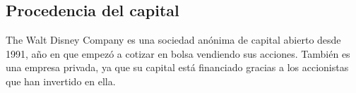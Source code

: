 \subsection{Procedencia del capital}
The Walt Disney Company es una sociedad anónima de capital abierto desde 1991, año en que empezó a cotizar en bolsa vendiendo sus acciones. También es una empresa privada, ya que su capital está financiado gracias a los accionistas que han invertido en ella.